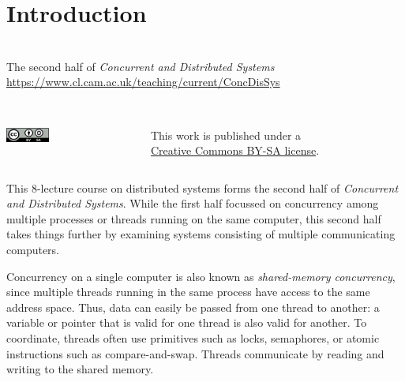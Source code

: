 \newpage
\section{Introduction}\label{sec:introduction}

\begin{frame}
    \label{s:title}
    \begin{center}
        \textbf{\huge{\color{darkblue}{Distributed Systems}}} \\[2em]
        The second half of \emph{Concurrent and Distributed Systems}\\[0.5em]
        \url{https://www.cl.cam.ac.uk/teaching/current/ConcDisSys}\\[2em]
        \mydetails\\[1em]
    \end{center}
    \begin{columns}[totalwidth=9cm]
        \begin{column}{4cm}
            \hfill\includegraphics[height=0.5cm]{images/creative-commons.png}\hspace{5pt}
        \end{column}
        \begin{column}{5cm}\scriptsize
            This work is published under a\\\href{https://creativecommons.org/licenses/by-sa/4.0/}{Creative Commons BY-SA license}.
        \end{column}
    \end{columns}
\end{frame}

This 8-lecture course on distributed systems forms the second half of \emph{Concurrent and Distributed Systems}.
While the first half focussed on concurrency among multiple processes or threads running on the same computer, this second half takes things further by examining systems consisting of multiple communicating computers.

Concurrency on a single computer is also known as \emph{shared-memory concurrency}, since multiple threads running in the same process have access to the same address space.
Thus, data can easily be passed from one thread to another: a variable or pointer that is valid for one thread is also valid for another.
To coordinate, threads often use primitives such as locks, semaphores, or atomic instructions such as compare-and-swap.
Threads communicate by reading and writing to the shared memory.

